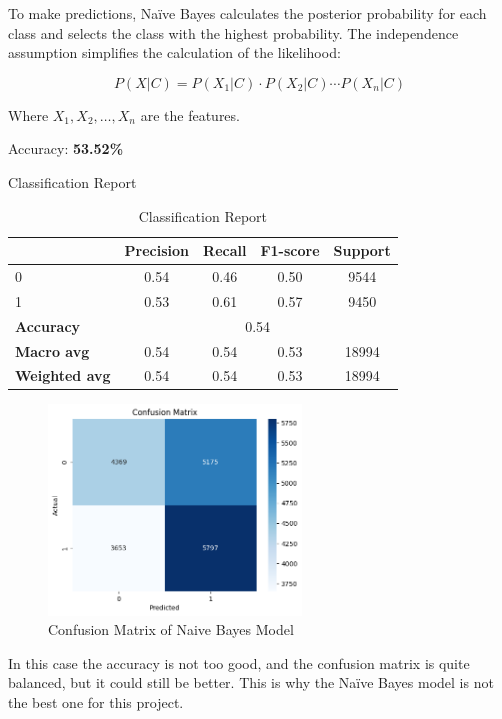 To make predictions, Naïve Bayes calculates the posterior probability for each class and selects the class with the highest probability. The independence assumption simplifies the calculation of the likelihood:

\[
P(X | C) = P(X_1 | C) \cdot P(X_2 | C) \cdots P(X_n | C)
\]

Where \( X_1, X_2, \ldots, X_n \) are the features.

Accuracy: \textbf{53.52\%}


Classification Report
\begin{table}[h]
    \centering
    \begin{tabular}{lcccc}
        \toprule
        & \textbf{Precision} & \textbf{Recall} & \textbf{F1-score} & \textbf{Support} \\
        \midrule
        0 & 0.54 & 0.46 & 0.50 & 9544 \\
        1 & 0.53 & 0.61 & 0.57 & 9450 \\
        \midrule
        \textbf{Accuracy} & \multicolumn{4}{c}{0.54} \\
        \textbf{Macro avg} & 0.54 & 0.54 & 0.53 & 18994 \\
        \textbf{Weighted avg} & 0.54 & 0.54 & 0.53 & 18994 \\
        \bottomrule
    \end{tabular}
    \caption{Classification Report}
    \label{tab:classification_report}
\end{table}

\begin{figure}[h] 
    \centering 
    \includegraphics[width=0.6\textwidth]{media/naive_bayes_confusion_matrix.png}
    \caption{Confusion Matrix of Naive Bayes Model}

\end{figure}

In this case the accuracy is not too good, and the confusion matrix is quite balanced, but it could still be better. This is why the Naïve Bayes model is not the best one for this project.
\newpage


